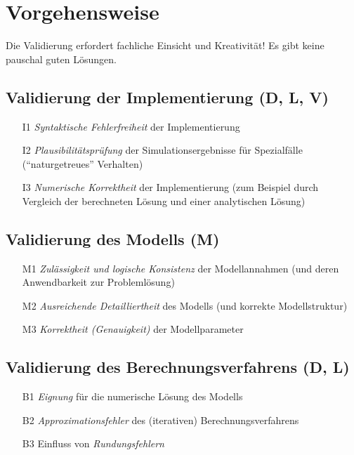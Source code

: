 	\section{Vorgehensweise} %
		Die Validierung erfordert fachliche Einsicht und Kreativität! Es gibt keine pauschal guten Lösungen.

		\subsection{Validierung der Implementierung (D, L, V)} %
			\begin{itemize}
				\item[I1] \textit{Syntaktische Fehlerfreiheit} der Implementierung
				\item[I2] \textit{Plausibilitätsprüfung} der Simulationsergebnisse für Spezialfälle (\enquote{naturgetreues} Verhalten)
				\item[I3] \textit{Numerische Korrektheit} der Implementierung (zum Beispiel durch Vergleich der berechneten Lösung und einer analytischen Lösung)
			\end{itemize}

		\subsection{Validierung des Modells (M)} %
			\begin{itemize}
				\item[M1] \textit{Zulässigkeit und logische Konsistenz} der Modellannahmen (und deren Anwendbarkeit zur Problemlösung)
				\item[M2] \textit{Ausreichende Detailliertheit} des Modells (und korrekte Modellstruktur)
				\item[M3] \textit{Korrektheit (Genauigkeit)} der Modellparameter
			\end{itemize}

		\subsection{Validierung des Berechnungsverfahrens (D, L)} %
			\begin{itemize}
				\item[B1] \textit{Eignung} für die numerische Lösung des Modells
				\item[B2] \textit{Approximationsfehler} des (iterativen) Berechnungsverfahrens
				\item[B3] Einfluss von \textit{Rundungsfehlern}
			\end{itemize}

